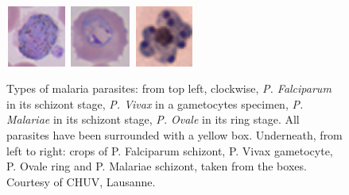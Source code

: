\documentclass[final,a4paper,12pt,english]{UnicaPhdThesis3}
\begin{document}
\begin{figure}[!t]
	\includegraphics[width=2cm, height=2cm]{images/malaria/f2_Pvivax_crop}
	\includegraphics[width=2cm, height=2cm]{images/malaria/f2_Povale_crop}
	\includegraphics[width=2cm, height=2cm]{images/malaria/f2_Pmalariae_crop}
	\caption{\label{fig5_malaria_types}Types of malaria parasites: from top left, clockwise, \emph{P. Falciparum} in its schizont stage, \emph{P. Vivax} in a gametocytes specimen, \emph{P. Malariae} in its schizont stage, \emph{P. Ovale} in its ring stage. All parasites have been surrounded with a yellow box. Underneath, from left to right: crops of P. Falciparum schizont, P. Vivax gametocyte, P. Ovale ring and P. Malariae schizont, taken from the boxes. Courtesy of CHUV, Lausanne.}
\end{figure}
\end{document}
